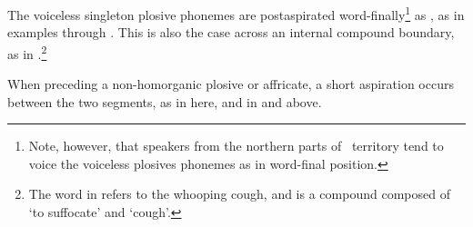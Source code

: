 The voiceless singleton plosive phonemes are postaspirated word-finally\footnote{Note, however, that speakers from the northern parts of \PS\ territory tend to voice the voiceless plosives phonemes as \ipa{[b d g]} in word-final position.} 
as \ipa{[pʰ\,tʰ\,kʰ]}, as in examples  through . This is also the case across an internal compound boundary, as in .\footnote{The word  in  refers to the whooping cough, and is a compound composed of  ‘to suffocate’ and  ‘cough’.}

When preceding a non-homorganic plosive or affricate, a short aspiration occurs between the two segments, as in  here, and in  and  above. 

